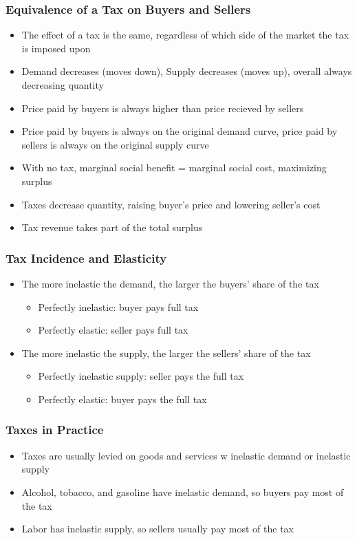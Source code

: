 \documentclass[11pt]{article}
\begin{document}
\subsubsection{Equivalence of a Tax on Buyers and Sellers}
\label{sec:orgf837b16}
\begin{itemize}
\item The effect of a tax is the same, regardless of which side of the market the tax is imposed upon
\item Demand decreases (moves down), Supply decreases (moves up), overall always decreasing quantity
\item Price paid by buyers is always higher than price recieved by sellers
\item Price paid by buyers is always on the original demand curve, price paid by sellers is 
always on the original supply curve
\item With no tax, marginal social benefit = marginal social cost, maximizing surplus
\item Taxes decrease quantity, raising buyer's price and lowering seller's cost
\item Tax revenue takes part of the total surplus
\end{itemize}
\subsubsection{Tax Incidence and Elasticity}
\label{sec:orgcd72ed2}
\begin{itemize}
\item The more inelastic the demand, the larger the buyers' share of the tax
\begin{itemize}
\item Perfectly inelastic: buyer pays full tax
\item Perfectly elastic: seller pays full tax
\end{itemize}
\item The more inelastic the supply, the larger the sellers' share of the tax
\begin{itemize}
\item Perfectly inelastic supply: seller pays the full tax
\item Perfectly elastic: buyer pays the full tax
\end{itemize}
\end{itemize}
\subsubsection{Taxes in Practice}
\label{sec:org9ba1de5}
\begin{itemize}
\item Taxes are usually levied on goods and services w inelastic demand or inelastic supply
\item Alcohol, tobacco, and gasoline have inelastic demand, so buyers pay most of the tax
\item Labor has inelastic supply, so sellers usually pay most of the tax
\end{itemize}
\end{document}
